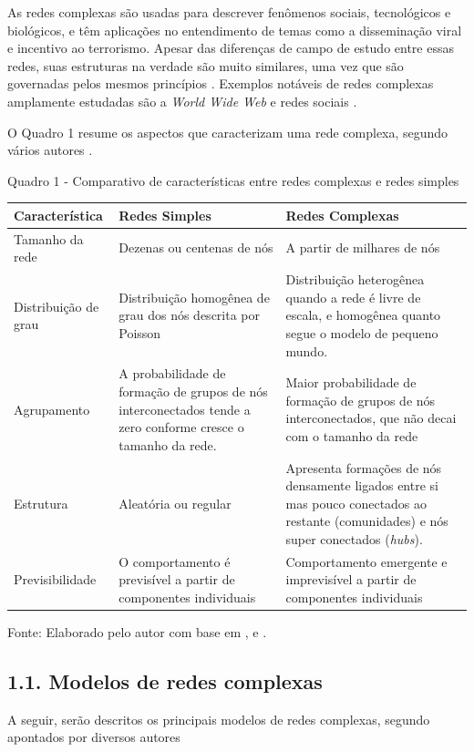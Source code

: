\documentclass[12pt,oneside,a4paper,brazil,sumario=tradicional]{abntex2}
\begin{document}
As redes complexas são usadas para descrever fenômenos sociais, tecnológicos e biológicos, e têm aplicações no entendimento de temas como a disseminação viral e incentivo ao terrorismo. Apesar das diferenças de campo de estudo entre essas redes, suas estruturas na verdade são muito similares, uma vez que são governadas pelos mesmos princípios \parencite{mata2020}. Exemplos notáveis de redes complexas amplamente estudadas são a \textit{World Wide Web} e redes sociais \parencite{newman2003}.

O Quadro 1 resume os aspectos que caracterizam uma rede complexa, segundo vários autores \parencite{mata2020, newman2003, wang2003}.

Quadro 1 - Comparativo de características entre redes complexas e redes simples

\begin{center}
\begin{tabular}{p{4cm}|p{4cm}|p{4cm}}
\toprule
\textbf{Característica} & \textbf{Redes Simples} & \textbf{Redes Complexas} \\
\midrule
Tamanho da rede & Dezenas ou centenas de nós & A partir de milhares de nós \\
Distribuição de grau & Distribuição homogênea de grau dos nós descrita por Poisson & Distribuição heterogênea quando a rede é livre de escala, e homogênea quanto segue o modelo de pequeno mundo. \\
Agrupamento & A probabilidade de formação de grupos de nós interconectados tende a zero conforme cresce o tamanho da rede. & Maior probabilidade de formação de grupos de nós interconectados, que não decai com o tamanho da rede \\
Estrutura & Aleatória ou regular & Apresenta formações de nós densamente ligados entre si mas pouco conectados ao restante (comunidades) e nós super conectados (\textit{hubs}). \\
Previsibilidade & O comportamento é previsível a partir de componentes individuais & Comportamento emergente e imprevisível a partir de componentes individuais \\
\bottomrule
\end{tabular}
\end{center}
Fonte: Elaborado pelo autor com base em \textcite{newman2003}, \textcite{mata2020} e \textcite{wang2003}.

\subsection*{1.1. Modelos de redes complexas}
A seguir, serão descritos os principais modelos de redes complexas, segundo apontados por diversos autores \parencite{barabasi2002, newman2010, latora2017}
\end{document}
